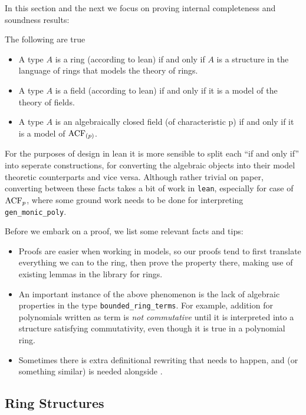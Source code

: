 In this section and the next we focus on proving internal
completeness and soundness results:
\begin{prop}
  The following are true
  \begin{itemize}
    \item A type $A$ is a ring (according to lean) if and only if
          $A$ is a structure in the language of rings
          that models the theory of rings.
    \item A type $A$ is a field (according to lean) if and only if
          it is a model of the theory of fields.
    \item A type $A$ is an algebraically closed field (of characteristic p)
          if and only if it is a model of $\operatorname{ACF}_{(p)}$.
  \end{itemize}
  For the purposes of design in lean it is
  more sensible to split each ``if and only if'' into seperate constructions,
  for converting the algebraic objects into their model theoretic counterparts
  and vice versa.
  Although rather trivial on paper,
  converting between these facts takes a bit of work in \texttt{lean},
  especially for case of $\operatorname{ACF}_{p}$,
  where some ground work needs to be done for interpreting \texttt{gen\_monic\_poly}.
\end{prop}

Before we embark on a proof, we list some relevant facts and tips:
\begin{itemize}
  \item Proofs are easier when working in models, so our proofs tend to
        first translate everything we can to the ring,
        then prove the property there,
        making use of existing lemmas in the library for rings.
  \item An important instance of the above phenomenon is the lack
        of algebraic properties in the type \texttt{bounded\_ring\_terms}.
        For example, addition for polynomials written as term
        is \textit{not commutative} until it is interpreted into a structure
        satisfying commutativity,
        even though it is true in a polynomial ring.
  \item Sometimes there is extra definitional rewriting that needs to happen,
        and  (or something similar) is needed alongside .
\end{itemize}

\subsection{Ring Structures}

